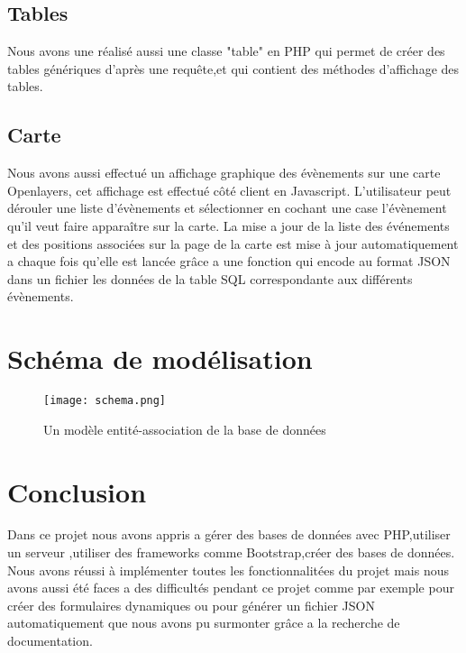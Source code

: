 \documentclass[french]{article}
\begin{document}
            \subsection{Tables}
            Nous avons une réalisé aussi une classe "table" en PHP qui permet de créer des tables génériques d'après une requête,et qui contient des méthodes d'affichage des tables.  
            \subsection{Carte}
            Nous avons aussi effectué un affichage graphique des évènements sur une carte Openlayers,
            cet affichage est effectué côté client en Javascript.
            L'utilisateur peut dérouler une liste d'évènements et sélectionner en cochant une case l'évènement qu'il veut faire apparaître sur la carte.
            La mise a jour de la liste des événements et des positions associées sur la page de la carte est mise à jour automatiquement a chaque fois qu'elle est lancée grâce a une fonction qui encode au format JSON dans un fichier les données de la table SQL correspondante aux différents évènements.
        \section{Schéma de modélisation}
        \begin{figure}[!h]
        \centering
        \texttt{[image: schema.png]}
        \caption{Un modèle entité-association de la base de données}
        \end{figure}
        \section{Conclusion}
        Dans ce projet nous avons appris a gérer des bases de données avec PHP,utiliser un serveur ,utiliser des frameworks comme Bootstrap,créer des bases de données.
        Nous avons réussi à implémenter toutes les fonctionnalitées du projet mais nous avons aussi été faces a des difficultés pendant ce projet comme par exemple pour créer des formulaires dynamiques ou pour générer un fichier JSON automatiquement que nous avons pu surmonter grâce a la recherche de documentation.
        
        
\end{document}
